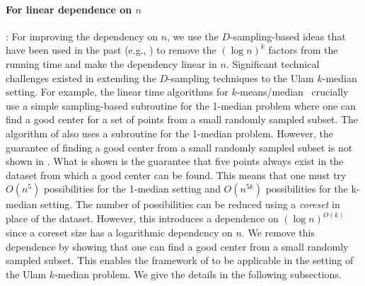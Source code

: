 \documentclass[11pt]{llncs}
\begin{document}
\paragraph{\bf For linear dependence on $n$}: For improving the dependency on $n$, we use the $ D$-sampling-based ideas that have been used in the past (e.g., \cite{jks,bjk18}) to remove the $(\log{n})^k$ factors from the running time and make the dependency linear in $n$. 
Significant technical challenges existed in extending the $D$-sampling techniques to the Ulam $k$-median setting.
For example, the linear time algorithms for $k$-means/median~\cite{jks,bjk18} crucially use a simple sampling-based subroutine for the 1-median problem where one can find a good center for a set of points from a small randomly sampled subset. The algorithm of \cite{cdk23} also uses a subroutine for the 1-median problem. However, the guarantee of finding a good center from a small randomly sampled subset is not shown in \cite{cdk23}. What is shown is the guarantee that five points always exist in the dataset from which a good center can be found. This means that one must try $O(n^5)$ possibilities for the 1-median setting and $O(n^{5k})$ possibilities for the k-median setting. The number of possibilities can be reduced using a {\em coreset} in place of the dataset. However, this introduces a dependence on $(\log{n})^{O(k)}$ since a coreset size has a logarithmic dependency on $n$. We remove this dependence by showing that one can find a good center from a small randomly sampled subset. This enables the framework of \cite{jks,bjk18} to be applicable in the setting of the Ulam $k$-median problem. We give the details in the following subsections.
\end{document}
